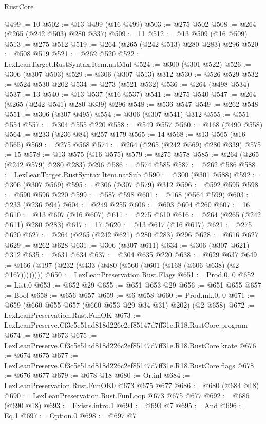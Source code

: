 \begin{lexlean}{RustCore}
\begin{coremodule}
@499 := 10
@502 := @13 @499 (@16 @499)
@503 := @275 @502
@508 := @264 (@265 (@242 @503) @280 @337)
@509 := 11
@512 := @13 @509 (@16 @509)
@513 := @275 @512
@519 := @264 (@265 (@242 @513) @280 @283) @296
@520 := @508 @519
@521 := @262 @520
@522 := LexLeanTarget.RustSyntax.Item.natMul
@524 := @300 (@301 @522)
@526 := @306 (@307 @503)
@529 := @306 (@307 @513) @312
@530 := @526 @529
@532 := @524 @530 @202
@534 := @273 (@521 @532)
@536 := @264 (@498 @534)
@537 := 13
@540 := @13 @537 (@16 @537)
@541 := @275 @540
@547 := @264 (@265 (@242 @541) @280 @339) @296
@548 := @536 @547
@549 := @262 @548
@551 := @306 (@307 @495)
@554 := @306 (@307 @541) @312
@555 := @551 @554
@557 := @304 @555 @220
@558 := @549 @557
@560 := @168 (@490 @558)
@564 := @233 (@236 @84) @257 @179
@565 := 14
@568 := @13 @565 (@16 @565)
@569 := @275 @568
@574 := @264 (@265 (@242 @569) @280 @339)
@575 := 15
@578 := @13 @575 (@16 @575)
@579 := @275 @578
@585 := @264 (@265 (@242 @579) @280 @283) @296
@586 := @574 @585
@587 := @262 @586
@588 := LexLeanTarget.RustSyntax.Item.natSub
@590 := @300 (@301 @588)
@592 := @306 (@307 @569)
@595 := @306 (@307 @579) @312
@596 := @592 @595
@598 := @590 @596 @220
@599 := @587 @598
@601 := @168 (@564 @599)
@603 := @233 (@236 @94)
@604 := @249 @255
@606 := @603 @604 @260
@607 := 16
@610 := @13 @607 (@16 @607)
@611 := @275 @610
@616 := @264 (@265 (@242 @611) @280 @283)
@617 := 17
@620 := @13 @617 (@16 @617)
@621 := @275 @620
@627 := @264 (@265 (@242 @621) @280 @283) @296
@628 := @616 @627
@629 := @262 @628
@631 := @306 (@307 @611)
@634 := @306 (@307 @621) @312
@635 := @631 @634
@637 := @304 @635 @220
@638 := @629 @637
@649 := @166 (@197 (@232 (@433 (@480 (@560 (@601 (@168 (@606 @638) (@2 @167))))))))
@650 := LexLeanPreservation.Rust.Flags
@651 := Prod.{0, 0}
@652 := List.{0}
@653 := @652 @29
@655 := @651 @653 @29
@656 := @651 @655
@657 := Bool
@658 := @656 @657
@659 := @6 @658
@660 := Prod.mk.{0, 0}
@671 := @659 (@660 @655 @657 (@660 @653 @29 @34 @31) @202) (@2 @658)
@672 := LexLeanPreservation.Rust.FunOK
@673 := LexLeanPreserve.Cf3c5e51ad818d226c2ef85147d7ff31e.R18.RustCore.program
@674 := @672 @673
@675 := LexLeanPreserve.Cf3c5e51ad818d226c2ef85147d7ff31e.R18.RustCore.krate
@676 := @674 @675
@677 := LexLeanPreserve.Cf3c5e51ad818d226c2ef85147d7ff31e.R18.RustCore.flags
@678 := @676 @677
@679 := @678 @18
@680 := Or.inl
@684 := LexLeanPreservation.Rust.FunOK0 @673 @675 @677
@686 := @680 (@684 @18)
@690 := LexLeanPreservation.Rust.FunLoop @673 @675 @677
@692 := @686 (@690 @18)
@693 := Exists.intro.{1}
@694 := @693 @7
@695 := And
@696 := Eq.{1}
@697 := Option.{0}
@698 := @697 @7

\end{coremodule}
\end{lexlean}
